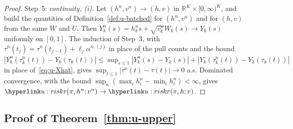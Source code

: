 \documentclass[11pt]{article}
\newcommand{\R}{\mathbb{R}}
\newcommand{\1}{\mathbf{1}}
\begin{document}
\begin{proof}
Step~5: \emph{continuity, (i).} Let $(h^n,v^n)\to(h,v)$ in $\R^K\times[0,\infty)^K$, and build the quantities of Definition~\ref{def:u-batched} for $(h^n,v^n)$ and
for $(h,v)$ from the same $W$ and $U$. Then $Y^n_k(s)=h^n_ks+\sqrt{v^n_k}W_k(s)\to Y_k(s)$ uniformly on $[0,1]$. The induction of Step~3, with
$\tau^n(t_j)=\tau^n(t_{j-1})+\ell_j\alpha^{n,(j)}$ in place of the pull counts and the bound
$|Y^n_k(\tau^n_k(t))-Y_k(\tau_k(t))|\le\sup_{s\le1}|Y^n_k(s)-Y_k(s)|+|Y_k(\tau^n_k(t))-Y_k(\tau_k(t))|$ in place of~\eqref{eq:u-Xhat}, gives
$\sup_{t\le1}|\tau^n(t)-\tau(t)|\to0$ a.s. Dominated convergence, with the bound $\sup_n(\max_ih^n_i-\min_ih^n_i)<\infty$, gives
$\urk(\pi,h^n;v^n)\to\urk(\pi,h;v)$.
\end{proof}


\subsection{Proof of Theorem~\ref{thm:u-upper}}\label{sec:app-u-proof-main}
\end{document}
